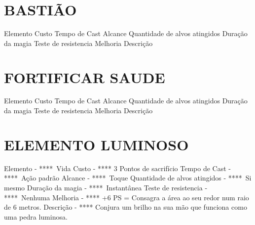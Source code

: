 \documentclass{article}%
\begin{document}
%
\section{BASTIÃO}%
\label{sec:BASTIO}%
Elemento \newline%
Custo \newline%
Tempo de Cast \newline%
Alcance \newline%
Quantidade de alvos atingidos \newline%
Duração da magia \newline%
Teste de resistencia \newline%
Melhoria \newline%
Descrição \newline%

%
\section{FORTIFICAR SAUDE}%
\label{sec:FORTIFICARSAUDE}%
Elemento \newline%
Custo \newline%
Tempo de Cast \newline%
Alcance \newline%
Quantidade de alvos atingidos \newline%
Duração da magia \newline%
Teste de resistencia \newline%
Melhoria \newline%
Descrição \newline%

%
\section{ELEMENTO LUMINOSO}%
\label{sec:ELEMENTOLUMINOSO}%
Elemento {-} ****~Vida\newline%
Custo {-} **** 3 Pontos de sacrifício\newline%
Tempo de Cast {-} ****~Ação padrão\newline%
Alcance {-} ****~Toque\newline%
Quantidade de alvos atingidos {-} ****~Si mesmo\newline%
Duração da magia {-} ****~Instantânea\newline%
Teste de resistencia {-} ****~Nenhuma\newline%
Melhoria {-} **** +6 PS = Consagra a área ao seu redor num raio de 6 metros.\newline%
Descrição {-} **** Conjura um brilho na sua mão que funciona como uma pedra luminosa.\newline%
\end{document}
